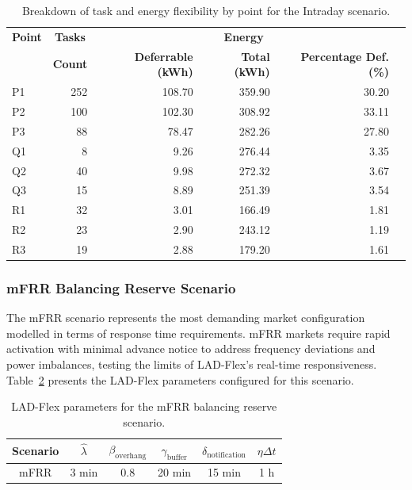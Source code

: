 \documentclass[preprint,12pt]{elsarticle}
\begin{document}
\begin{table}[h!]
\centering
\renewcommand{\arraystretch}{1.2}
\begin{tabular}{@{}lrr rrr@{}}
\toprule
\textbf{Point} & \multicolumn{1}{c}{\textbf{Tasks}} & \multicolumn{3}{c}{\textbf{Energy}} \\
              & \textbf{Count} & \textbf{Deferrable (kWh)} & \textbf{Total (kWh)} & \textbf{Percentage Def. (\%)} \\
\midrule
P1 & 252 & 108.70 & 359.90 & 30.20 \\
P2 & 100 & 102.30 & 308.92 & 33.11 \\
P3 & 88  & 78.47  & 282.26 & 27.80 \\
Q1 & 8   & 9.26   & 276.44 & 3.35  \\
Q2 & 40  & 9.98   & 272.32 & 3.67  \\
Q3 & 15  & 8.89   & 251.39 & 3.54  \\
R1 & 32  & 3.01   & 166.49 & 1.81  \\
R2 & 23  & 2.90   & 243.12 & 1.19  \\
R3 & 19  & 2.88   & 179.20 & 1.61  \\
\bottomrule
\end{tabular}
\caption{Breakdown of task and energy flexibility by point for the Intraday scenario.}
\label{tab:energy_flexibility_intraday}
\end{table}


\subsubsection{mFRR Balancing Reserve Scenario} \label{mfrr_scenario}

The mFRR scenario represents the most demanding market configuration modelled in terms of response time requirements. mFRR markets require rapid activation with minimal advance notice to address frequency deviations and power imbalances, testing the limits of LAD-Flex's real-time responsiveness. Table~\ref{tab:parameters_mfrr} presents the LAD-Flex parameters configured for this scenario.

\begin{table}[h!]
\centering
\begin{tabular}{@{}cccccc@{}}
\toprule
\textbf{Scenario} & $\hat{\lambda}$ & $\beta_\text{overhang}$ & $\gamma_{\text{buffer}}$ & $\delta_{\text{notification}}$ & $\eta{\Delta t}$ \\ \midrule
mFRR & 3 min & 0.8 & 20 min & 15 min & 1 h \\ \bottomrule
\end{tabular}
\caption{LAD-Flex parameters for the mFRR balancing reserve scenario.}
\label{tab:parameters_mfrr}
\end{table}
\end{document}

